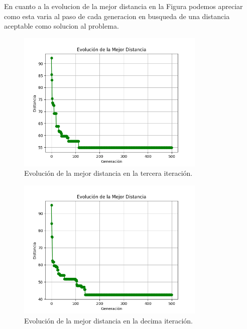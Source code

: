 \documentclass{article}
\begin{document}
 En cuanto a la evolucion de la mejor distancia en la Figura   podemos apreciar como esta varia al paso de cada generacion en busqueda de una distancia aceptable como solucion al problema.
  \begin{figure}[h]
    \centering
    \includegraphics[width=9cm]{img/203Generacion.png}
    \caption{Evolución de la mejor distancia en la tercera iteración.}
    \label{fig:etiqueta7}
  \end{figure}
  
  \begin{figure}[h]
    \centering
    \includegraphics[width=9cm]{img/2015Generacion.png}
    \caption{Evolución de la mejor distancia en la decima iteración.}
    \label{fig:etiqueta8}
  \end{figure}
\end{document}
